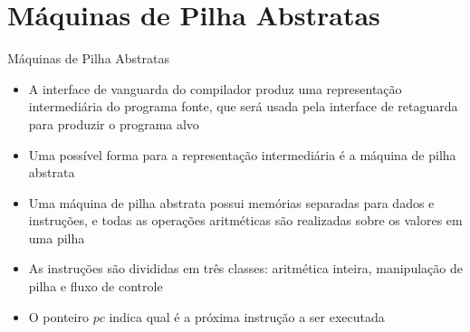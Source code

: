 \section{Máquinas de Pilha Abstratas}

\begin{frame}[fragile]{Máquinas de Pilha Abstratas}

    \begin{itemize}
        \item A interface de vanguarda do compilador produz uma representação intermediária do programa fonte, que será usada pela interface de retaguarda para
            produzir o programa alvo

        \item Uma possível forma para a representação intermediária é a máquina de pilha abstrata

        \item Uma máquina de pilha abstrata possui memórias separadas para dados e instruções, e todas as operações aritméticas são realizadas sobre os valores
            em uma pilha

        \item As instruções são divididas em três classes: aritmética inteira, manipulação de pilha e fluxo de controle

        \item O ponteiro $pc$ indica qual é a próxima instrução a ser executada
    \end{itemize}

\end{frame}

